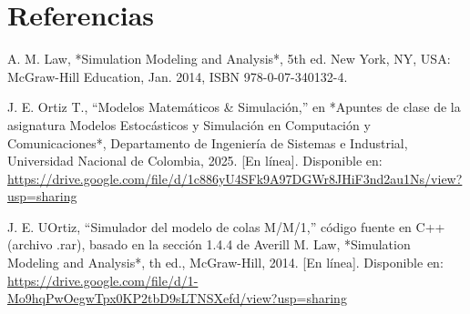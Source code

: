 \documentclass{article}
\begin{document}
\section{Referencias}
\renewcommand{\refname}{}
\begin{thebibliography}{9}

 \label{ref:modSim} A. M. Law, *Simulation Modeling and Analysis*, 5th ed. 
New York, NY, USA: McGraw-Hill Education, Jan. 2014, ISBN 978-0-07-340132-4. 

 \label{ref:matSim} J. E. Ortiz T., “Modelos Matemáticos \& Simulación,”
 en *Apuntes de clase de la asignatura Modelos Estocásticos y Simulación en 
 Computación y Comunicaciones*, Departamento de Ingeniería de Sistemas e Industrial, 
 Universidad Nacional de Colombia, 2025. [En línea]. Disponible en: 
 \url{https://drive.google.com/file/d/1c886yU4SFk9A97DGWr8JHiF3nd2au1Ns/view?usp=sharing}

  \label{ref:cimColas} J. E. UOrtiz, “Simulador del modelo de colas M/M/1,” 
 código fuente en C++ (archivo .rar), basado en la sección 
 1.4.4 de Averill M. Law, *Simulation Modeling and Analysis*, 
 th ed., McGraw-Hill, 2014. [En línea]. Disponible en: 
 \url{https://drive.google.com/file/d/1-Mo9hqPwOegwTpx0KP2tbD9sLTNSXefd/view?usp=sharing}



\end{thebibliography}
\end{document}
